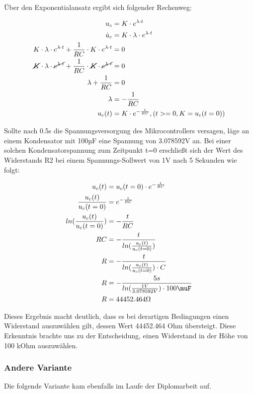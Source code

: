 Über den Exponentialansatz ergibt sich folgender Rechenweg:

\begin{align*}
    u_c &= K \cdot e^{\lambda \cdot t} \\
    \dot{u}_c &= K \cdot \lambda \cdot e^{\lambda \cdot t} \\
    K \cdot \lambda \cdot e^{\lambda \cdot t} + \frac{1}{RC} \cdot K \cdot e^{\lambda \cdot t} &= 0 \\
    \cancel{K} \cdot \lambda \cdot \cancel{e^{\lambda \cdot t}} + \frac{1}{RC} \cdot \cancel{K} \cdot \cancel{e^{\lambda \cdot t}} &= 0 \\
    \lambda + \frac{1}{RC} &= 0 \\
    \lambda &= -\frac{1}{RC} \\
    u_c(t) &= K \cdot e^{-\frac{t}{RC}}, (t >= 0, K = u_c(t=0)) \\
\end{align*}

Sollte nach 0.5s die Spannungsversorgung des Mikrocontrollers versagen, läge an einem Kondensator mit 100µF eine Spannung von 3.078592V an.
Bei einer solchen Kondensatorspannung zum Zeitpunkt t=0 erschließt sich der
Wert des Widerstands R2 bei einem Spannungs-Sollwert von 1V nach 5 Sekunden wie folgt:

\begin{align*}
    u_c(t) &= u_c(t=0) \cdot e^{-\frac{t}{RC}} \\
    \frac{u_c(t)}{u_c(t=0)} &= e^{-\frac{t}{RC}} \\
    ln(\frac{u_c(t)}{u_c(t=0)}) &= -\frac{t}{RC} \\
    RC &= -\frac{t}{ln(\frac{u_c(t)}{u_c(t=0)})} \\
    R &= -\frac{t}{ln(\frac{u_c(t)}{u_c(t=0)}) \cdot C} \\
    R &= -\frac{5s}{ln(\frac{1V}{3.078592V}) \cdot 100\muF} \\
    R &= 44452.464\Omega
\end{align*}

Dieses Ergebnis macht deutlich, dass es bei derartigen Bedingungen einen Widerstand auszuwählen gilt, dessen Wert 44452.464 Ohm übersteigt.
Diese Erkenntnis brachte uns zu der Entscheidung, einen Widerstand in der Höhe von 100 kOhm auszuwählen.

\newpage

\subsubsection{Andere Variante }
Die folgende Variante kam ebenfalls im Laufe der Diplomarbeit auf.

